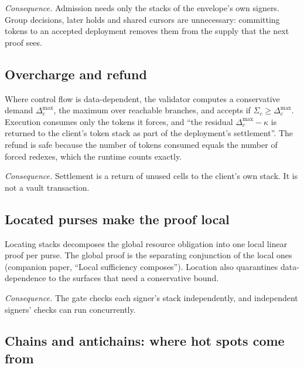 \documentclass[11pt]{article}
\begin{document}
\emph{Consequence.} Admission needs only the stacks of the envelope's own signers. Group decisions, later holds and shared cursors are unnecessary: committing tokens to an accepted deployment removes them from the supply that the next proof sees.

\subsection{Overcharge and refund}

Where control flow is data-dependent, the validator computes a conservative demand $\Delta^{\max}_c$, the maximum over reachable branches, and accepts if $\Sigma_c \ge \Delta^{\max}_c$. Execution consumes only the tokens it forces, and ``the residual $\Delta^{\max}_c - \kappa$ is returned to the client's token stack as part of the deployment's settlement''. The refund is safe because the number of tokens consumed equals the number of forced redexes, which the runtime counts exactly.

\emph{Consequence.} Settlement is a return of unused cells to the client's own stack. It is not a vault transaction.

\subsection{Located purses make the proof local}

Locating stacks decomposes the global resource obligation into one local linear proof per purse. The global proof is the separating conjunction of the local ones (companion paper, ``Local sufficiency composes''). Location also quarantines data-dependence to the surfaces that need a conservative bound.

\emph{Consequence.} The gate checks each signer's stack independently, and independent signers' checks can run concurrently.

\subsection{Chains and antichains: where hot spots come from}
\end{document}

